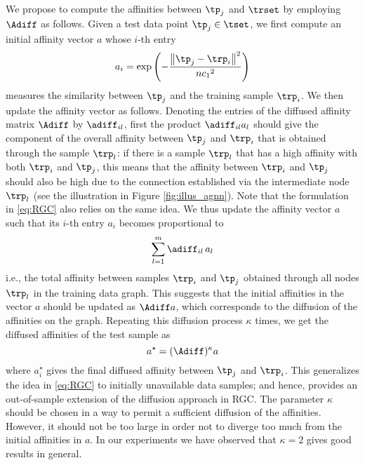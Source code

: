 \documentclass[journal]{IEEEtran}
\begin{document}
We propose to compute the affinities between $\tp_j$ and $\trset$ by employing $\Adiff$ as follows. Given a test data point $\tp_j \in \tset$, we first compute an initial affinity vector $a$ whose $i$-th entry
%
\begin{equation}
\label{eq:aff_init_test}
a_i=\exp\left(-\frac{\left\| \tp_j -\trp_i \right\|^2}{n{c_1}^2}\right)
\end{equation}
%
measures the similarity between $\tp_j$ and the training sample $\trp_i$. We then update the affinity vector as follows. Denoting the entries of the diffused affinity matrix $\Adiff$ by $\adiff_{il}$, first the product $\adiff_{il} a_l$ should give the component of the overall affinity between $\tp_j$ and $\trp_i$ that is obtained through the sample $\trp_l$: if there is a sample $\trp_l$ that has a high affinity with both $\trp_i$ and $\tp_j$, this means that the affinity between $\trp_i$ and $\tp_j$ should also be high due to the connection established via the intermediate node $\trp_l$ (see the illustration in Figure \ref{fig:illus_agnn}). Note that the formulation in \eqref{eq:RGC} also relies on the same idea. We thus update the affinity vector $a$ such that its $i$-th entry $a_i$ becomes proportional to
%
\begin{equation}
\label{eq:agnn_oos_singlep}
\sum_{l=1}^m \adiff_{il} \, a_l
\end{equation}
%
i.e., the total affinity between samples $\trp_i$ and $\tp_j$ obtained through all nodes $\trp_l$ in the training data graph. This suggests that the initial affinities in the vector $a$ should be updated as $\Adiff a$, which corresponds to the diffusion of the affinities on the graph. Repeating this diffusion process $\kappa$ times, we get the diffused affinities of the test sample as
%
\begin{equation}
\label{eq:diff_aff_test}
a^{\star}=(\Adiff) ^{\kappa}a
\end{equation}
%
where $a^{\star}_i$ gives the final diffused affinity between $\tp_j$ and $\trp_i$. This generalizes the idea in \eqref{eq:RGC} to initially unavailable data samples; and hence, provides an out-of-sample extension of the diffusion approach in RGC. The parameter $\kappa$ should be chosen in a way to permit a sufficient diffusion of the affinities. However, it should not be too large in order not to diverge too much from the initial affinities in $a$. In our experiments we have observed that $\kappa=2$ gives good results in general.
\end{document}
